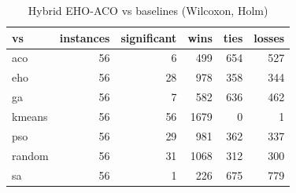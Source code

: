 \begin{table}
\caption{Hybrid EHO-ACO vs baselines (Wilcoxon, Holm)}
\begin{tabular}{lrrrrr}
\toprule
vs & instances & significant & wins & ties & losses \\
\midrule
aco & 56 & 6 & 499 & 654 & 527 \\
eho & 56 & 28 & 978 & 358 & 344 \\
ga & 56 & 7 & 582 & 636 & 462 \\
kmeans & 56 & 56 & 1679 & 0 & 1 \\
pso & 56 & 29 & 981 & 362 & 337 \\
random & 56 & 31 & 1068 & 312 & 300 \\
sa & 56 & 1 & 226 & 675 & 779 \\
\bottomrule
\end{tabular}
\end{table}
